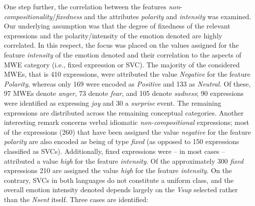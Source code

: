 \documentclass[output=paper]{langsci/langscibook}
\begin{document}
One step further, the correlation between the features
\textit{non}-\textit{compositionality}/\linebreak \textit{fixedness}
and the attributes \textit{polarity} and
\textit{intensity} was examined. Our underlying assumption
was that the degree of fixedness of the relevant expressions and the
polarity/intensity of the emotion denoted are highly correlated. In
this respect, the focus was placed on the values assigned for the
feature \textit{intensity} of the emotion denoted and their correlation to the
aspects of MWE category (i.e., fixed expression or SVC). The majority
of the considered  MWEs, that is 410 expressions, were attributed the
value \textit{Negative} for the feature \textit{Polarity},
whereas only 169 were encoded as \textit{Positive} and 133
as \textit{Neutral}. Of these, 97 MWEs denote
\textit{anger}, 73 denote \textit{fear}, and 105
denote \textit{sadness}; 90 expressions were identified as
expressing \textit{joy} and 30 a
\textit{surprise} event. The remaining expressions are
distributed across the remaining conceptual categories. Another
interesting remark concerns verbal idiomatic \textit{non-compositional}
expressions; most of the expressions (260) that have been assigned the
value \textit{negative} for the feature
\textit{polarity} are also encoded as being of type
\textit{fixed} (as opposed to 150 expressions classified as
SVCs). Additionally, fixed expressions were – in most cases –
attributed a value \textit{high} for the feature\textit{
intensity}. Of the approximately 300 \textit{fixed }expressions 210 are
assigned the value \textit{high }for the feature \textit{intensity}. On
the contrary, SVCs in both languages do not constitute a uniform class,
and the overall emotion intensity denoted depends largely on the
\textit{Vsup} selected rather than the \textit{Nsent }itself. Three
cases are identified:
\end{document}
